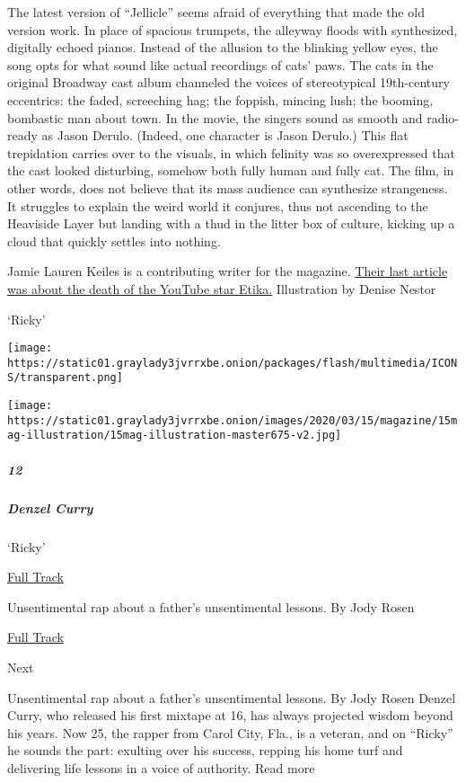 The latest version of ``Jellicle'' seems afraid of everything that made
the old version work. In place of spacious trumpets, the alleyway floods
with synthesized, digitally echoed pianos. Instead of the allusion to
the blinking yellow eyes, the song opts for what sound like actual
recordings of cats' paws. The cats in the original Broadway cast album
channeled the voices of stereotypical 19th-century eccentrics: the
faded, screeching hag; the foppish, mincing lush; the booming, bombastic
man about town. In the movie, the singers sound as smooth and
radio-ready as Jason Derulo. (Indeed, one character is Jason Derulo.)
This flat trepidation carries over to the visuals, in which felinity was
so overexpressed that the cast looked disturbing, somehow both fully
human and fully cat. The film, in other words, does not believe that its
mass audience can synthesize strangeness. It struggles to explain the
weird world it conjures, thus not ascending to the Heaviside Layer but
landing with a thud in the litter box of culture, kicking up a cloud
that quickly settles into nothing.

Jamie Lauren Keiles is a contributing writer for the magazine.
\href{https://www.nytimes3xbfgragh.onion/interactive/2019/12/23/magazine/etika-death.html}{Their
last article was about the death of the YouTube star Etika.}
Illustration by Denise Nestor

`Ricky'

\texttt{[image: https://static01.graylady3jvrrxbe.onion/packages/flash/multimedia/ICONS/transparent.png]}

\texttt{[image: https://static01.graylady3jvrrxbe.onion/images/2020/03/15/magazine/15mag-illustration/15mag-illustration-master675-v2.jpg]}

\hypertarget{12}{%
\subparagraph{12}\label{12}}

\hypertarget{denzel-curry}{%
\subparagraph{Denzel Curry}\label{denzel-curry}}

`Ricky'

\href{https://open.spotify.com/track/2QbGvQssb0VLLS4x5NOmyJ?si=NQhTBAl7TUOVgCelHRw72Q}{
Full Track}

Unsentimental rap about a father's unsentimental lessons. By Jody Rosen

\href{https://open.spotify.com/track/2QbGvQssb0VLLS4x5NOmyJ?si=NQhTBAl7TUOVgCelHRw72Q}{Full
Track }

Next

Unsentimental rap about a father's unsentimental lessons. By Jody Rosen
Denzel Curry, who released his first mixtape at 16, has always projected
wisdom beyond his years. Now 25, the rapper from Carol City, Fla., is a
veteran, and on ``Ricky'' he sounds the part: exulting over his success,
repping his home turf and delivering life lessons in a voice of
authority. Read more

